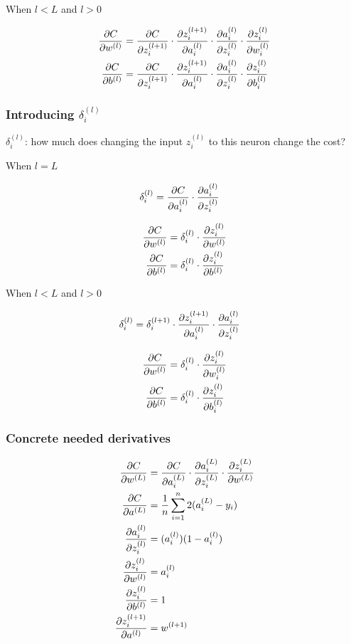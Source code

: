 \documentclass{article}
\begin{document}
When $l < L$ and $l > 0$

\begin{align}
\frac{\partial C}{\partial w^{(l)}} &= \frac{\partial C}{\partial z_i^{(l+1)}}
  \cdot \frac{\partial z_i^{(l+1)}}{\partial a_i^{(l)}}
  \cdot \frac{\partial a_i^{(l)}}{\partial z_i^{(l)}}
  \cdot \frac{\partial z_i^{(l)}}{\partial w_i^{(l)}} \\
\frac{\partial C}{\partial b^{(l)}} &= \frac{\partial C}{\partial z_i^{(l+1)}}
  \cdot \frac{\partial z_i^{(l+1)}}{\partial a_i^{(l)}}
  \cdot \frac{\partial a_i^{(l)}}{\partial z_i^{(l)}}
  \cdot \frac{\partial z_i^{(l)}}{\partial b_i^{(l)}}
\end{align}

\subsubsection{Introducing $\delta_i^{(l)}$}

$\delta_i^{(l)}$: how much does changing the input $z_i^{(l)}$
to this neuron change the cost?

When $l = L$

\begin{align}
\delta_i^{(l)} &= \frac{\partial C}{\partial a_i^{(l)}} \cdot \frac{\partial a_i^{(l)}}{\partial z_i^{(l)}}
\end{align}

\begin{align}
\frac{\partial C}{\partial w^{(l)}} &= \delta_i^{(l)}
  \cdot \frac{\partial z_i^{(l)}}{\partial w^{(l)}} \\
\frac{\partial C}{\partial b^{(l)}} &= \delta_i^{(l)}
  \cdot \frac{\partial z_i^{(l)}}{\partial b^{(l)}}
\end{align}

When $l < L$ and $l > 0$

\begin{align}
\delta_i^{(l)} &= \delta_i^{(l+1)} 
  \cdot \frac{\partial z_i^{(l+1)}}{\partial a_i^{(l)}}
  \cdot \frac{\partial a_i^{(l)}}{\partial z_i^{(l)}}
\end{align}

\begin{align}
\frac{\partial C}{\partial w^{(l)}} &= \delta_i^{(l)}
  \cdot \frac{\partial z_i^{(l)}}{\partial w_i^{(l)}} \\
\frac{\partial C}{\partial b^{(l)}} &= \delta_i^{(l)}
  \cdot \frac{\partial z_i^{(l)}}{\partial b_i^{(l)}}
\end{align}

\subsubsection{Concrete needed derivatives}

\begin{align}
\pd{C}{w^{(L)}} &= \pd{C}{a_i^{(L)}}\cdot\pd{a_i^{(L)}}{z_i^{(L)}}\cdot\pd{z_i^{(L)}}{w^{(L)}} \\
\pd{C}{a^{(L)}} &= \avgsum[i,n] 2 (a_i^{(L)} - y_i) \\
\pd{a_i^{(l)}}{z_i^{(l)}} &= ({a_i^{(l)}}) (1-{a_i^{(l)}}) \\
\pd{z_i^{(l)}}{w^{(l)}} & = a_i^{(l)} \\
\pd{z_i^{(l)}}{b^{(l)}} & = 1 \\
\pd{z_i^{(l+1)}}{a^{(l)}} & = w^{(l+1)}
\end{align}
\end{document}
